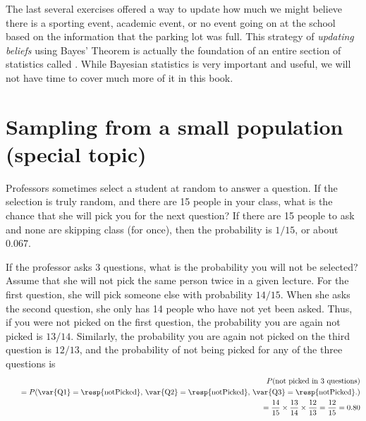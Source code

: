 The last several exercises offered a way to update how much we might believe there is a sporting event, academic event, or no event going on at the school based on the information that the parking lot was full. This strategy of \emph{updating beliefs} using Bayes' Theorem is actually the foundation of an entire section of statistics called . While Bayesian statistics is very important and useful, we will not have time to cover much more of it in this book.

\section{Sampling from a small population (special topic)}
\label{smallPop}

\begin{example}{Professors sometimes select a student at random to answer a question. If the selection is truly random, and there are 15 people in your class, what is the chance that she will pick you for the next question?}
If there are 15 people to ask and none are skipping class (for once), then the probability is $1/15$, or about $0.067$.
\end{example}

\begin{example}{If the professor asks 3 questions, what is the probability you will not be selected? Assume that she will not pick the same person twice in a given lecture.}\label{3woRep}
For the first question, she will pick someone else with probability $14/15$. When she asks the second question, she only has 14 people who have not yet been asked. Thus, if you were not picked on the first question, the probability you are again not picked is $13/14$. Similarly, the probability you are again not picked on the third question is $12/13$, and the probability of not being picked for any of the three questions is
\begin{eqnarray*}
&&P(\text{not picked in 3 questions}) \\
&&\quad = P(\text{\var{Q1}} = \text{\resp{notPicked}, }\text{\var{Q2}} = \text{\resp{notPicked}, }\text{\var{Q3}} = \text{\resp{notPicked}.}) \\
&&\quad = \frac{14}{15}\times\frac{13}{14}\times\frac{12}{13} = \frac{12}{15} = 0.80
\end{eqnarray*}
\end{example}


